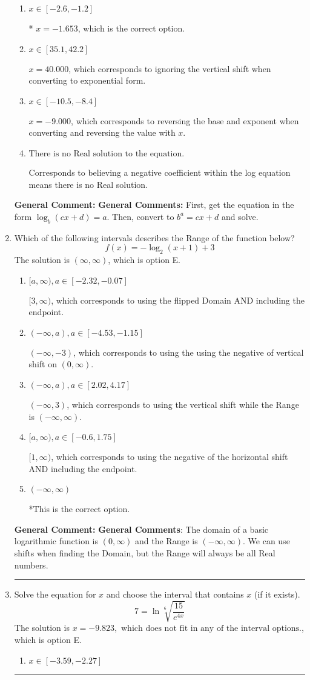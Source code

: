 \documentclass{extbook}[14pt]
\newcommand{\litem}[1]{\item #1

\rule{\textwidth}{0.4pt}}
\begin{document}
\begin{enumerate}
{\begin{enumerate}[label=\Alph*.]
$x = -12.333$, which corresponds to reversing the base and exponent when converting.
\item \( x \in [-2.6, -1.2] \)

* $x = -1.653$, which is the correct option.
\item \( x \in [35.1, 42.2] \)

$x = 40.000$, which corresponds to ignoring the vertical shift when converting to exponential form.
\item \( x \in [-10.5, -8.4] \)

$x = -9.000$, which corresponds to reversing the base and exponent when converting and reversing the value with $x$.
\item \( \text{There is no Real solution to the equation.} \)

Corresponds to believing a negative coefficient within the log equation means there is no Real solution.
\end{enumerate}

\textbf{General Comment:} \textbf{General Comments:} First, get the equation in the form $\log_b{(cx+d)} = a$. Then, convert to $b^a = cx+d$ and solve.
}
\litem{
Which of the following intervals describes the Range of the function below?
\[ f(x) = -\log_2{(x+1)}+3 \]The solution is \( (\infty, \infty) \), which is option E.\begin{enumerate}[label=\Alph*.]
\item \( [a, \infty), a \in [-2.32, -0.07] \)

$[3, \infty)$, which corresponds to using the flipped Domain AND including the endpoint.
\item \( (-\infty, a), a \in [-4.53, -1.15] \)

$(-\infty, -3)$, which corresponds to using the using the negative of vertical shift on $(0, \infty)$.
\item \( (-\infty, a), a \in [2.02, 4.17] \)

$(-\infty, 3)$, which corresponds to using the vertical shift while the Range is $(-\infty, \infty)$.
\item \( [a, \infty), a \in [-0.6, 1.75] \)

$[1, \infty)$, which corresponds to using the negative of the horizontal shift AND including the endpoint.
\item \( (-\infty, \infty) \)

*This is the correct option.
\end{enumerate}

\textbf{General Comment:} \textbf{General Comments}: The domain of a basic logarithmic function is $(0, \infty)$ and the Range is $(-\infty, \infty)$. We can use shifts when finding the Domain, but the Range will always be all Real numbers.
}
\litem{
 Solve the equation for $x$ and choose the interval that contains $x$ (if it exists).
\[  7 = \ln{\sqrt[6]{\frac{15}{e^{4x}}}} \]The solution is \( x = -9.823, \text{ which does not fit in any of the interval options.} \), which is option E.\begin{enumerate}[label=\Alph*.]
\item \( x \in [-3.59, -2.27] \)


\end{enumerate}}
\end{enumerate}
\end{document}
